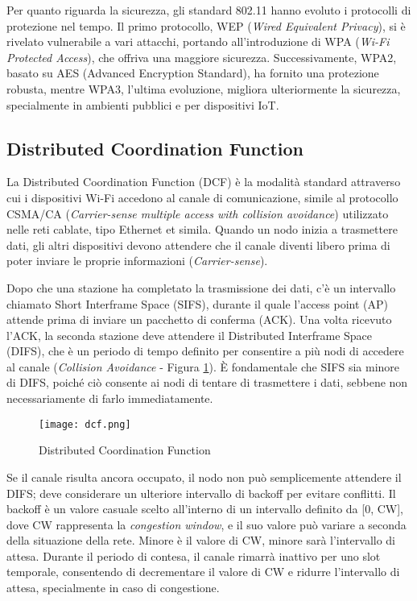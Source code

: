 Per quanto riguarda la sicurezza, gli standard 802.11 hanno evoluto i protocolli di protezione nel tempo. Il primo protocollo, WEP (\textit{Wired Equivalent Privacy}), si è rivelato vulnerabile a vari attacchi, portando all'introduzione di WPA (\textit{Wi-Fi Protected Access}), che offriva una maggiore sicurezza. Successivamente, WPA2, basato su AES (Advanced Encryption Standard), ha fornito una protezione robusta, mentre WPA3, l'ultima evoluzione, migliora ulteriormente la sicurezza, specialmente in ambienti pubblici e per dispositivi IoT.

\subsection[DCF]{Distributed Coordination Function}
La Distributed Coordination Function (DCF) è la modalità standard attraverso cui i dispositivi Wi-Fi accedono al canale di comunicazione, simile al protocollo CSMA/CA (\textit{Carrier-sense multiple access with collision avoidance}) utilizzato nelle reti cablate, tipo Ethernet et simila. Quando un nodo inizia a trasmettere dati, gli altri dispositivi devono attendere che il canale diventi libero prima di poter inviare le proprie informazioni (\textit{Carrier-sense}).

Dopo che una stazione ha completato la trasmissione dei dati, c'è un intervallo chiamato Short Interframe Space (SIFS), durante il quale l'access point (AP) attende prima di inviare un pacchetto di conferma (ACK). Una volta ricevuto l'ACK, la seconda stazione deve attendere il Distributed Interframe Space (DIFS), che è un periodo di tempo definito per consentire a più nodi di accedere al canale (\textit{Collision Avoidance} - Figura \ref{fig:dcf}). È fondamentale che SIFS sia minore di DIFS, poiché ciò consente ai nodi di tentare di trasmettere i dati, sebbene non necessariamente di farlo immediatamente.

\begin{figure}[h!]
    \centering
    \texttt{[image: dcf.png]}
    \caption{Distributed Coordination Function}
    \label{fig:dcf}
\end{figure}

Se il canale risulta ancora occupato, il nodo non può semplicemente attendere il DIFS; deve considerare un ulteriore intervallo di backoff per evitare conflitti. Il backoff è un valore casuale scelto all'interno di un intervallo definito da [0, CW], dove CW rappresenta la \textit{congestion window}, e il suo valore può variare a seconda della situazione della rete. Minore è il valore di CW, minore sarà l'intervallo di attesa. Durante il periodo di contesa, il canale rimarrà inattivo per uno slot temporale, consentendo di decrementare il valore di CW e ridurre l'intervallo di attesa, specialmente in caso di congestione.

